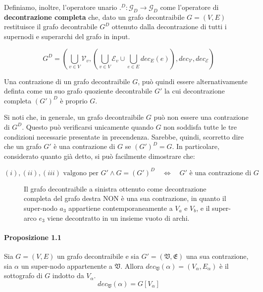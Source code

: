     Definiamo, inoltre, l'operatore unario $.^D : \mathcal{G}_D \rightarrow \mathcal{G}_D$ come l'operatore di
    \textbf{decontrazione completa} che, dato un grafo decontraibile $G = (V, E)$ restituisce il grafo decontrabile
    $G^D$ ottenuto dalla decontrazione di tutti i supernodi e superarchi del grafo in input.

    \begin{equation*}
        G^D = (\bigcup_{v \in V} \mathcal{V}_v , (\bigcup_{v \in V} \mathcal{E}_v \cup \bigcup_{e \in E} dec_E(e)),
        dec_{\mathcal{V}}, dec_{\mathcal{E}})
    \end{equation*}

    Una contrazione di un grafo decontraibile $G$, pu\`o quindi essere alternativamente definta come un suo grafo
    quoziente decontrabile $G'$ la cui decontrazione completa $(G')^D$ \`e proprio $G$.
    \newline

    Si noti che, in generale, un grafo decontraibile $G$ pu\`o non essere una contrazione di $G^D$.
    Questo pu\`o verificarsi unicamente quando $G$ non soddisfa tutte le tre condizioni necessarie presentate in
    precendenza.
    Sarebbe, quindi, scorretto dire che un grafo $G'$ \`e una contrazione di $G$ se $(G')^D = G$.
    In particolare, considerato quanto gi\`a detto, si pu\`o facilmente dimostrare che:

    \begin{equation*}
        (i), (ii), (iii) \text{ valgono per } G' \land G = (G')^D \quad \Longleftrightarrow \quad G' \text{ \`e una contrazione di } G
    \end{equation*}

\begin{figure}[H]
    \centering
    
    \caption{Il grafo decontraibile a sinistra ottenuto come decontrazione completa del grafo destra NON \`e una
    sua contrazione, in quanto il super-nodo $a_3$ appartiene contemporaneamente a $V_a$ e $V_b$,
        e il super-arco $e_3$ viene decontratto in un insieme vuoto di archi.}
    \label{fig:example3}
\end{figure}

    \paragraph{Proposizione 1.1}
    Sia $G=(V, E)$ un grafo decontraibile e sia $G\mathcal{'} = (\mathfrak{V}, \mathfrak{E})$ una sua contrazione,
    sia $\alpha$ un super-nodo appartenente a $\mathfrak{V}$.
    Allora $dec_{\mathfrak{V}}(\alpha) = (V_\alpha, E_\alpha)$ \`e il sottografo di $G$ indotto da $V_\alpha$.
    \begin{equation*}
        dec_{\mathfrak{V}}(\alpha) = G[V_\alpha]
    \end{equation*}
